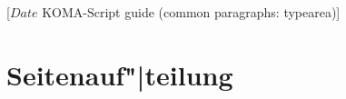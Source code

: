 %
%
%
%
%
%
%
%
% 
%
%
%
%

                 [$Date$
                  KOMA-Script guide (common paragraphs: typearea)]


\section{\texorpdfstring{Seitenauf"|teilung}{Seitenaufteilung}}
\BeginIndexGroup
{}

